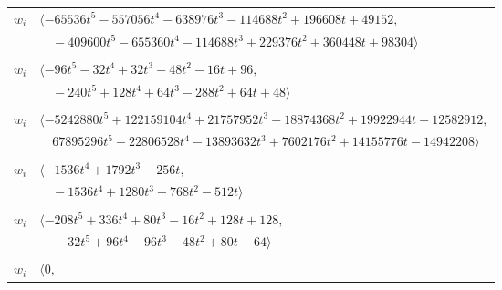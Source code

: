 \documentclass[11pt]{article}
\begin{document}
\begin{longtable}{@{}ll@{}}
$w_i$ & $\langle -65536t^{5}-557056t^{4}-638976t^{3}-114688t^{2}+196608t+49152,$\\
 & $\quad -409600t^{5}-655360t^{4}-114688t^{3}+229376t^{2}+360448t+98304\rangle$\\
\addlinespace[2pt]
\multicolumn{2}{@{}p{0.97\textwidth}@{}}{$i=17$, $D_i=16$, $\rho_{ij}$: $0{:}2, \allowbreak 10{:}2, \allowbreak 12{:}1, \allowbreak 15{:}1, \allowbreak 16{:}2, \allowbreak 39{:}2, \allowbreak 64{:}2, \allowbreak 66{:}2, \allowbreak 68{:}1$}\\
$w_i$ & $\langle -96t^{5}-32t^{4}+32t^{3}-48t^{2}-16t+96,$\\
 & $\quad -240t^{5}+128t^{4}+64t^{3}-288t^{2}+64t+48\rangle$\\
\addlinespace[2pt]
\multicolumn{2}{@{}p{0.97\textwidth}@{}}{$i=18$, $D_i=262144$, $\rho_{ij}$: $11{:}1, \allowbreak 15{:}1, \allowbreak 16{:}2, \allowbreak 19{:}2, \allowbreak 38{:}2, \allowbreak 39{:}1, \allowbreak 45{:}2, \allowbreak 47{:}1, \allowbreak 49{:}2, \allowbreak 57{:}2$}\\
$w_i$ & $\langle -5242880t^{5}+122159104t^{4}+21757952t^{3}-18874368t^{2}+19922944t+12582912,$\\
 & $\quad 67895296t^{5}-22806528t^{4}-13893632t^{3}+7602176t^{2}+14155776t-14942208\rangle$\\
\addlinespace[2pt]
\multicolumn{2}{@{}p{0.97\textwidth}@{}}{$i=19$, $D_i=256$, $\rho_{ij}$: $5{:}1, \allowbreak 6{:}1, \allowbreak 7{:}1, \allowbreak 15{:}2, \allowbreak 18{:}1, \allowbreak 28{:}1, \allowbreak 38{:}1, \allowbreak 53{:}1$}\\
$w_i$ & $\langle -1536t^{4}+1792t^{3}-256t,$\\
 & $\quad -1536t^{4}+1280t^{3}+768t^{2}-512t\rangle$\\
\addlinespace[2pt]
\multicolumn{2}{@{}p{0.97\textwidth}@{}}{$i=20$, $D_i=16$, $\rho_{ij}$: $1{:}2, \allowbreak 5{:}1, \allowbreak 14{:}2, \allowbreak 26{:}1, \allowbreak 32{:}1, \allowbreak 46{:}2, \allowbreak 54{:}2, \allowbreak 65{:}2$}\\
$w_i$ & $\langle -208t^{5}+336t^{4}+80t^{3}-16t^{2}+128t+128,$\\
 & $\quad -32t^{5}+96t^{4}-96t^{3}-48t^{2}+80t+64\rangle$\\
\addlinespace[2pt]
\multicolumn{2}{@{}p{0.97\textwidth}@{}}{$i=21$, $D_i=8$, $\rho_{ij}$: $13{:}1, \allowbreak 23{:}1, \allowbreak 43{:}2, \allowbreak 61{:}2, \allowbreak 63{:}1, \allowbreak 65{:}2$}\\
$w_i$ & $\langle 0,$\\

\end{longtable}
\end{document}

